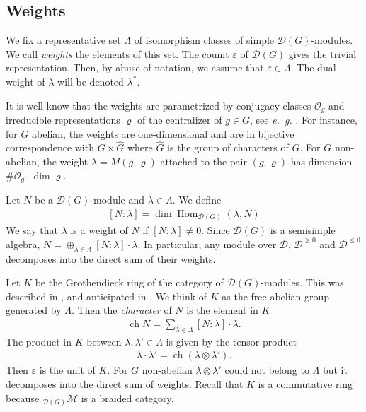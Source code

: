 \documentclass[reqno]{amsart}
\newcommand{\cO}{\mathcal{O}}
\newcommand{\cM}{\mathcal{M}}
\renewcommand{\_}[1]{_{\left( #1 \right)}}
\renewcommand{\^}[1]{^{\left( #1 \right)}}
\newcommand{\ot}{{\otimes}}
\newcommand{\D}{\mathcal{D}}
\newcommand{\ch}{\operatorname{ch}}
\newcommand\Hom{\operatorname{Hom}}
\theoremstyle{plain}
\theoremstyle{definition}
\theoremstyle{remark}
\begin{document}
\subsection{Weights} We fix a representative set $\Lambda$ of isomorphism classes of simple $\D(G)$-modules. We call {\it weights} the elements of this set. The counit $\varepsilon$ of $\D(G)$ gives the trivial representation. Then, by abuse of notation, we assume that $\varepsilon\in\Lambda$. The dual weight of $\lambda$ will be denoted $\lambda^*$.

It is well-know that the weights are parametrized by conjugacy classes $\cO_g$ and irreducible representations $\varrho$ of the centralizer of $g\in G$, see {\it e.~g.} \cite{MR1714540}. For instance, for $G$ abelian, the weights are one-dimensional and are in bijective correspondence with $G\times\widehat{G}$ where $\widehat{G}$ is the group of characters of $G$. For $G$ non-abelian, the  weight $\lambda=M(g,\varrho)$ attached to the pair $(g,\varrho)$ has dimension $\#\cO_g\cdot\dim\varrho$.


Let $N$ be a $\D(G)$-module and $\lambda\in\Lambda$. We define 
\begin{align}\label{eq:weight multiplicity}
[N:\lambda]=\dim\Hom_{\D(G)}(\lambda,N) 
\end{align}
We say that $\lambda$ is a weight of $N$ if $[N:\lambda]\neq0$. Since $\D(G)$ is a semisimple algebra, $N=\oplus_{\lambda\in\Lambda}[N:\lambda]\cdot\lambda$.  In particular, any module over $\D$, $\D^{\geq0}$ and $\D^{\leq0}$ decomposes into the direct sum of their weights.



Let $K$ be the Grothendieck ring of the category of $\D(G)$-modules. This was described in \cite{MR1367852}, and anticipated in \cite{MR933415}. We think of $K$ as the free abelian group generated by $\Lambda$. Then the {\it character} of $N$ is the element in $K$
\begin{align*}
\ch N=\sum_{\lambda\in\Lambda}[N:\lambda]\cdot\lambda.
\end{align*}
The product in $K$ between $\lambda,\lambda'\in\Lambda$ is given by the tensor product
\begin{align*}
\lambda\cdot\lambda'=\ch(\lambda\ot\lambda').
\end{align*}
Then $\varepsilon$ is the unit of $K$. For $G$ non-abelian $\lambda\ot\lambda'$ could not belong to $\Lambda$ but it decomposes into the direct sum of weights.
Recall that $K$ is a commutative ring because ${}_{\D(G)}\cM$ is a braided category.
\end{document}
